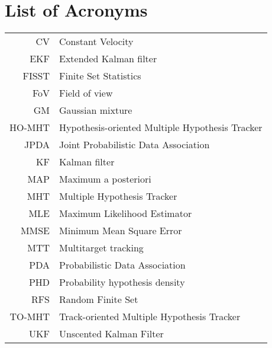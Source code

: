\chapter{List of Acronyms}

\begin{tabular}{rl}
CV & Constant Velocity \\
EKF & Extended Kalman filter \\
FISST & Finite Set Statistics \\
FoV & Field of view \\
GM & Gaussian mixture \\
HO-MHT & Hypothesis-oriented Multiple Hypothesis Tracker \\
JPDA & Joint Probabilistic Data Association \\
KF & Kalman filter \\
MAP & Maximum a posteriori \\
MHT & Multiple Hypothesis Tracker \\
MLE & Maximum Likelihood Estimator \\
MMSE & Minimum Mean Square Error \\
MTT & Multitarget tracking \\
PDA & Probabilistic Data Association \\
PHD & Probability hypothesis density \\
RFS & Random Finite Set \\
TO-MHT & Track-oriented Multiple Hypothesis Tracker \\
UKF & Unscented Kalman Filter \\
\end{tabular}
